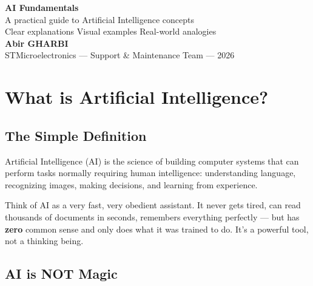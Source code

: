 \documentclass[11pt,a4paper]{report}
\begin{document}
\begin{titlepage}
\centering
\vspace*{3cm}
{\Huge\bfseries\color{stblue} AI Fundamentals\\[0.5cm]}
{\Large A practical guide to Artificial Intelligence concepts\\[1cm]}
{\normalsize Clear explanations \textbullet{} Visual examples \textbullet{} Real-world analogies\\[3cm]}
{\large\textbf{Abir GHARBI}\\[0.5cm]}
{\large STMicroelectronics — Support \& Maintenance Team — 2026\\[2cm]}
\vfill
\end{titlepage}

\tableofcontents
\newpage

\chapter{What is Artificial Intelligence?}

\section{The Simple Definition}

Artificial Intelligence (AI) is the science of building computer systems that can perform tasks normally requiring human intelligence: understanding language, recognizing images, making decisions, and learning from experience.

\begin{analogybox}
Think of AI as a very fast, very obedient assistant. It never gets tired, can read thousands of documents in seconds, remembers everything perfectly --- but has \textbf{zero} common sense and only does what it was trained to do. It's a powerful tool, not a thinking being.
\end{analogybox}

\section{AI is NOT Magic}
\end{document}
